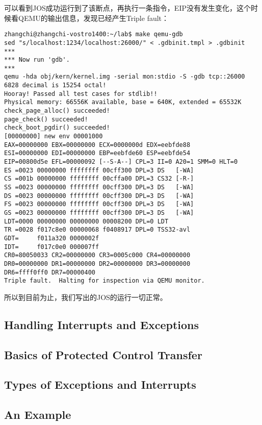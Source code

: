 \documentclass{article}
\begin{document}
\begin{CJK*}{UTF8}{gkai}
可以看到JOS成功运行到了该断点，再执行一条指令，EIP没有发生变化，这个时候看QEMU的输出信息，发现已经产生Triple fault：


\begin{lstlisting}[style=console]
zhangchi@zhangchi-vostro1400:~/lab$ make qemu-gdb
sed "s/localhost:1234/localhost:26000/" < .gdbinit.tmpl > .gdbinit
***
*** Now run 'gdb'.
***
qemu -hda obj/kern/kernel.img -serial mon:stdio -S -gdb tcp::26000
6828 decimal is 15254 octal!
Hooray! Passed all test cases for stdlib!!
Physical memory: 66556K available, base = 640K, extended = 65532K
check_page_alloc() succeeded!
page_check() succeeded!
check_boot_pgdir() succeeded!
[00000000] new env 00001000
EAX=00000000 EBX=00000000 ECX=0000000d EDX=eebfde88
ESI=00000000 EDI=00000000 EBP=eebfde60 ESP=eebfde54
EIP=00800d5e EFL=00000092 [--S-A--] CPL=3 II=0 A20=1 SMM=0 HLT=0
ES =0023 00000000 ffffffff 00cff300 DPL=3 DS   [-WA]
CS =001b 00000000 ffffffff 00cffa00 DPL=3 CS32 [-R-]
SS =0023 00000000 ffffffff 00cff300 DPL=3 DS   [-WA]
DS =0023 00000000 ffffffff 00cff300 DPL=3 DS   [-WA]
FS =0023 00000000 ffffffff 00cff300 DPL=3 DS   [-WA]
GS =0023 00000000 ffffffff 00cff300 DPL=3 DS   [-WA]
LDT=0000 00000000 00000000 00008200 DPL=0 LDT
TR =0028 f017c8e0 00000068 f0408917 DPL=0 TSS32-avl
GDT=     f011a320 0000002f
IDT=     f017c0e0 000007ff
CR0=80050033 CR2=00000000 CR3=0005c000 CR4=00000000
DR0=00000000 DR1=00000000 DR2=00000000 DR3=00000000 
DR6=ffff0ff0 DR7=00000400
Triple fault.  Halting for inspection via QEMU monitor.

\end{lstlisting}

所以到目前为止，我们写出的JOS的运行一切正常。


\subsection{Handling Interrupts and Exceptions}


\subsection{Basics of Protected Control Transfer}

\subsection{Types of Exceptions and Interrupts}

\subsection{An Example}


\end{CJK*}
\end{document}
